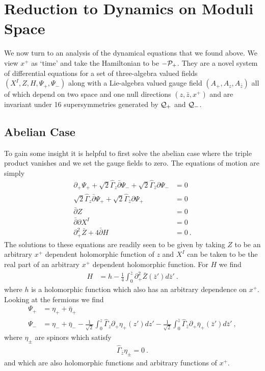 \documentclass[12pt]{article}
\newcommand{\hG}{{\hat \Gamma}}
\newcommand{\nn}{\nonumber}
\numberwithin{equation}{section}
\begin{document}
\section{Reduction to Dynamics on Moduli Space}

We now turn to an analysis of the dynamical equations that we found above. We view $x^+$ as `time' and take the Hamiltonian to be $-{\cal P}_+$. They are a novel system of differential equations for a set of three-algebra valued fields $(X^I,Z,H,\Psi_+,\Psi_-)$ along with a Lie-algebra valued gauge field $(A_+,A_z,A_{\bar z})$ all of which depend on  two space and one null directions $(z,\bar z , x^+)$ and are invariant under 16 supersymmetries generated by ${\cal Q}_+$ and ${\cal Q}_-$.
  
\subsection{Abelian Case}

To gain some insight it is helpful to first solve the abelian case where the triple product vanishes and we set the gauge fields to zero. The equations of motion  are simply
\begin{align}
\partial_+\Psi_+ +\sqrt{2}\hG_z\bar\partial \Psi_- +\sqrt{2}\hG_{\bar z}\partial \Psi_- &=0\nonumber\\
\sqrt{2}\hG_z\bar\partial \Psi_+ +\sqrt{2}\hG_{\bar z}\partial \Psi_+ &=0\nn\\
\bar \partial Z & = 0\nn\\
\bar\partial\partial X^I & = 0\nn\\
\partial^2_+{\bar Z} +  {4}\bar \partial H &=0\ .
\end{align}
The solutions to these equations are readily seen to be given by taking $Z$ to be an arbitrary $x^+$ dependent holomorphic function of $z$ and $X^I$ can be taken to be the real part of an   arbitrary $x^+$ dependent holomorphic function. For $H$ we find 
\begin{align}
  H &=h-\frac14 \int_0^{\bar z}  \partial_+^2 
{\bar Z}({\bar z'})d{\bar z'}\ .
\end{align}
where   $h$ is a holomorphic function   which also has an arbitrary dependence on  $x^+$. 
Looking at the fermions we find
\begin{align}
\Psi_+  & = \eta_++ {\bar \eta_+} \nn\\
\Psi_-& = \eta_- + {\bar\eta}_- -\frac{1}{\sqrt{2}}\int_0^{  z}\hG_{z} \partial_+ 
{ \eta}_+({ z'})d{ z'}-\frac{1}{\sqrt{2}}\int_0^{\bar z} \hG_{{\bar z}} \partial_+ 
{\bar\eta}_+({\bar z'})d{\bar z'} \ ,
\end{align}
where $\eta_\pm$ are spinors which satisfy
\begin{align}
\hat\Gamma_{\bar z}\eta_{\pm}=0\ .
\end{align}
and which are also holomorphic functions   and arbitrary functions of $x^+$.  
\end{document}
